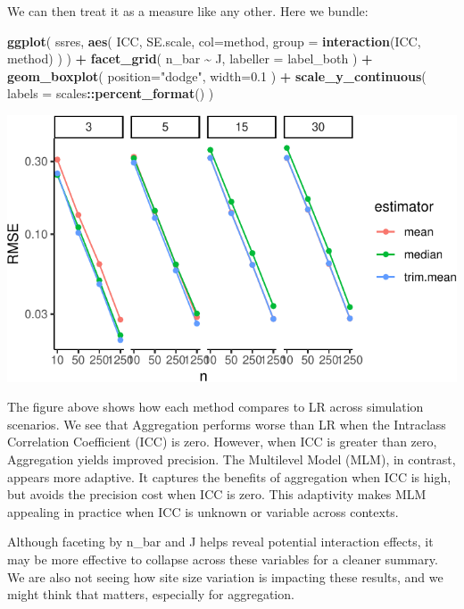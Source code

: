 \documentclass[
]{book}
\newenvironment{Shaded}{\begin{snugshade}}{\end{snugshade}}
\newcommand{\AttributeTok}[1]{\textcolor[rgb]{0.13,0.29,0.53}{#1}}
\newcommand{\FloatTok}[1]{\textcolor[rgb]{0.00,0.00,0.81}{#1}}
\newcommand{\FunctionTok}[1]{\textcolor[rgb]{0.13,0.29,0.53}{\textbf{#1}}}
\newcommand{\NormalTok}[1]{#1}
\newcommand{\SpecialCharTok}[1]{\textcolor[rgb]{0.81,0.36,0.00}{\textbf{#1}}}
\newcommand{\StringTok}[1]{\textcolor[rgb]{0.31,0.60,0.02}{#1}}
\begin{document}
We can then treat it as a measure like any other.
Here we bundle:

\begin{Shaded}
\begin{Highlighting}[]
\FunctionTok{ggplot}\NormalTok{( ssres, }\FunctionTok{aes}\NormalTok{( ICC, SE.scale, }\AttributeTok{col=}\NormalTok{method,}
                    \AttributeTok{group =} \FunctionTok{interaction}\NormalTok{(ICC, method) ) ) }\SpecialCharTok{+}
  \FunctionTok{facet\_grid}\NormalTok{( n\_bar }\SpecialCharTok{\textasciitilde{}}\NormalTok{  J, }\AttributeTok{labeller =}\NormalTok{ label\_both ) }\SpecialCharTok{+}
  \FunctionTok{geom\_boxplot}\NormalTok{( }\AttributeTok{position=}\StringTok{"dodge"}\NormalTok{, }\AttributeTok{width=}\FloatTok{0.1}\NormalTok{ ) }\SpecialCharTok{+}
  \FunctionTok{scale\_y\_continuous}\NormalTok{( }\AttributeTok{labels =}\NormalTok{ scales}\SpecialCharTok{::}\FunctionTok{percent\_format}\NormalTok{() )}
\end{Highlighting}
\end{Shaded}

\begin{center}\includegraphics[width=0.75\linewidth]{Designing-Simulations-in-R_files/figure-latex/unnamed-chunk-180-1} \end{center}

The figure above shows how each method compares to LR across simulation scenarios. We see that Aggregation performs worse than LR when the Intraclass Correlation Coefficient (ICC) is zero. However, when ICC is greater than zero, Aggregation yields improved precision.
The Multilevel Model (MLM), in contrast, appears more adaptive. It captures the benefits of aggregation when ICC is high, but avoids the precision cost when ICC is zero. This adaptivity makes MLM appealing in practice when ICC is unknown or variable across contexts.

Although faceting by n\_bar and J helps reveal potential interaction effects, it may be more effective to collapse across these variables for a cleaner summary.
We are also not seeing how site size variation is impacting these results, and we might think that matters, especially for aggregation.
\end{document}
